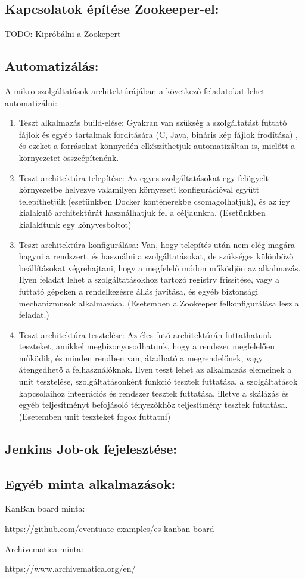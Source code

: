 \documentclass[]{article}
\providecommand{\tightlist}{%
  \setlength{\itemsep}{0pt}\setlength{\parskip}{0pt}}
\begin{document}
\subsection{Kapcsolatok építése
Zookeeper-el:}\label{kapcsolatok-uxe9puxedtuxe9se-zookeeper-el}

TODO: Kipróbálni a Zookepert

\subsection{Automatizálás:}\label{automatizuxe1luxe1s}

A mikro szolgáltatások architektúrájában a következő feladatokat lehet
automatizálni:

\begin{enumerate}
\def\labelenumi{\arabic{enumi}.}
\tightlist
\item
  Teszt alkalmazás build-elése: Gyakran van szükség a szolgáltatást
  futtató fájlok és egyéb tartalmak fordítására (C, Java, bináris kép
  fájlok frodítása) , és ezeket a forrásokat könnyedén elkészíthetjük
  automatizáltan is, mielőtt a környezetet összeépítenénk.
\item
  Teszt architektúra telepítése: Az egyes szolgáltatásokat egy felügyelt
  környezetbe helyezve valamilyen környezeti konfigurációval együtt
  telepíthetjük (esetünkben Docker konténerekbe csomagolhatjuk), és az
  így kialakuló architektúrát használhatjuk fel a céljaunkra.
  (Esetünkben kialakítunk egy könyvesboltot)
\item
  Teszt architektúra konfigurálása: Van, hogy telepítés után nem elég
  magára hagyni a rendszert, és használni a szolgáltatásokat, de
  szükséges különböző beállításokat végrehajtani, hogy a megfelelő módon
  működjön az alkalmazás. Ilyen feladat lehet a szolgáltatásokhoz
  tartozó registry frissítése, vagy a futtató gépeken a rendelkezésre
  állás javítása, és egyéb biztonsági mechanizmusok alkalmazása.
  (Esetemben a Zookeeper felkonfigurálása lesz a feladat.)
\item
  Teszt architektúra tesztelése: Az éles futó architektúrán futtathatunk
  teszteket, amikkel megbizonyosodhatunk, hogy a rendszer megfelelően
  működik, és minden rendben van, átadható a megrendelőnek, vagy
  átengedhető a felhasználóknak. Ilyen teszt lehet az alkalmazás
  elemeinek a unit tesztelése, szolgáltatásonként funkció tesztek
  futtatása, a szolgáltatások kapcsolaihoz integrációs és rendszer
  tesztek futtatása, illetve a skálázás és egyéb teljesítményt
  befojásoló tényezőkhöz teljesítmény tesztek futtatása. (Esetemben unit
  teszteket fogok futtatni)
\end{enumerate}

\subsection{Jenkins Job-ok
fejelesztése:}\label{jenkins-job-ok-fejelesztuxe9se}

\subsection{Egyéb minta
alkalmazások:}\label{egyuxe9b-minta-alkalmazuxe1sok}

KanBan board minta:

https://github.com/eventuate-examples/es-kanban-board

Archivematica minta:

https://www.archivematica.org/en/
\end{document}
